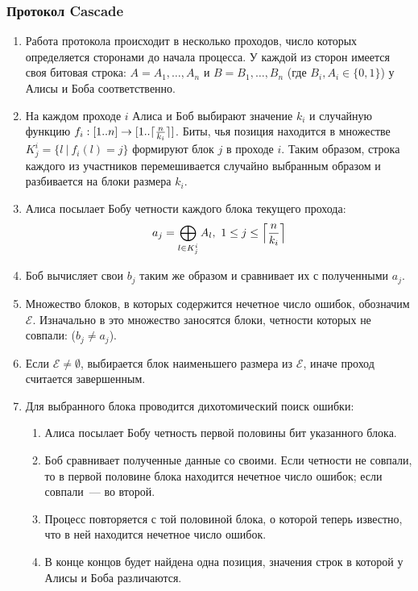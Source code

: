 \subsubsection{Протокол Cascade}\label{sec:cascade_description}
\begin{enumerate}
  \item Работа протокола происходит в несколько проходов, число которых определяется сторонами до начала процесса. У каждой из сторон имеется своя битовая строка: $A = A_1,\dots,A_n$ и $B = B_1,\dots,B_n$ (где $B_i,A_i \in \{0, 1\}$) у Алисы и Боба соответственно.
  
  \item На каждом проходе $i$ Алиса и Боб выбирают значение $k_i$ и случайную функцию $f_i: [1..n]\rightarrow[1..\ceil{\frac{n}{k_i}}]$. Биты, чья позиция находится в множестве $K^i_j = \{l~|~f_i(l) = j\}$ формируют блок $j$ в проходе $i$. Таким образом, строка каждого из участников перемешивается случайно выбранным образом и разбивается на блоки размера $k_i$.
  
  \item Алиса посылает Бобу четности каждого блока текущего прохода: 
  $$ a_j = \bigoplus_{l \in K^i_j} A_l,~ 1 \leq j \leq \ceil[\Big]{\frac{n}{k_i}} $$
  
  \item Боб вычисляет свои $b_j$ таким же образом и сравнивает их с полученными $a_j$. 
  
  \item Множество блоков, в которых содержится нечетное число ошибок, обозначим $\mathcal{E}$.
  Изначально в это множество заносятся блоки, четности которых не совпали: ($b_j \neq a_j $).
  
  \item\label{while_condition} Если $\mathcal{E} \neq \emptyset$, выбирается блок наименьшего размера из $\mathcal{E}$, иначе проход считается завершенным.
  
  \item Для выбранного блока проводится дихотомический поиск ошибки:
  \begin{enumerate}
    \item Алиса посылает Бобу четность первой половины бит указанного блока.
    \item Боб сравнивает полученные данные со своими. Если четности не совпали, то в первой половине блока находится нечетное число ошибок; если совпали~--- во второй.
    \item Процесс повторяется с той половиной блока, о которой теперь известно, что в ней находится нечетное число ошибок.
    \item В конце концов будет найдена одна позиция, значения строк в которой у Алисы и Боба различаются.
  \end{enumerate}
  

\end{enumerate}
